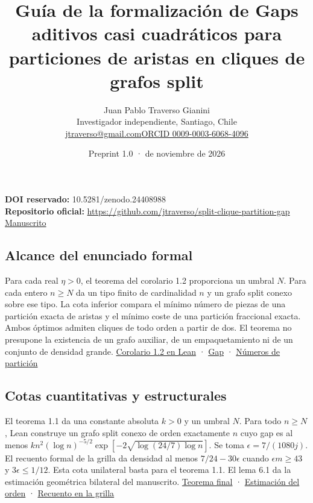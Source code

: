 \documentclass[spanish,11pt,a4paper]{article}
\title{Guía de la formalización de Gaps aditivos casi cuadráticos para particiones de aristas en cliques de grafos split}
\author{Juan Pablo Traverso Gianini\\\small Investigador independiente, Santiago, Chile\\\small\href{mailto:jtraverso@gmail.com}{jtraverso@gmail.com}\quad\href{https://orcid.org/0009-0003-6068-4096}{ORCID 0009-0003-6068-4096}}
\date{Preprint 1.0 \enspace · \enspace 21 de noviembre de 2026}
\begin{document}
\raggedbottom\maketitle
\noindent\textbf{DOI reservado:} 10.5281/zenodo.24408988\\
\textbf{Repositorio oficial:} \url{https://github.com/jtraverso/split-clique-partition-gap}\\
\href{https://github.com/jtraverso/split-clique-partition-gap/blob/main/preprints/SPLITGAP/01_manuscript/split-gap-es.pdf}{Manuscrito}
\subsection{Alcance del enunciado formal}\label{alcance-del-enunciado-formal}

Para cada real \(\eta>0\), el teorema del corolario 1.2 proporciona un umbral \(N\). Para cada entero \(n\ge N\) da un tipo finito de cardinalidad \(n\) y un grafo split conexo sobre ese tipo. La cota inferior compara el mínimo número de piezas de una partición exacta de aristas y el mínimo coste de una partición fraccional exacta. Ambos óptimos admiten cliques de todo orden a partir de dos. El teorema no presupone la existencia de un grafo auxiliar, de un empaquetamiento ni de un conjunto de densidad grande. \href{https://github.com/jtraverso/split-clique-partition-gap/blob/ccb5444b2ecdff9de1d6221133633a25a224953d/R434/UniversalR434.lean}{Corolario 1.2 en Lean} · \href{https://github.com/jtraverso/split-clique-partition-gap/blob/ccb5444b2ecdff9de1d6221133633a25a224953d/GapExtremal/Defs.lean}{Gap} · \href{https://github.com/jtraverso/split-clique-partition-gap/blob/ccb5444b2ecdff9de1d6221133633a25a224953d/GraphBase/Clique/Partition.lean}{Números de partición}

\subsection{Cotas cuantitativas y estructurales}\label{cotas-cuantitativas-y-estructurales}

El teorema 1.1 da una constante absoluta \(k>0\) y un umbral \(N\). Para todo \(n\ge N\), Lean construye un grafo split conexo de orden exactamente \(n\) cuyo gap es al menos \(k n^2(\log n)^{-5/2}\exp[-2\sqrt{\log(24/7)\log n}]\). Se toma \(\epsilon=7/(1080j)\). El recuento formal de la grilla da densidad al menos \(7/24-30\epsilon\) cuando \(\epsilon m\ge43\) y \(3\epsilon\le1/12\). Esta cota unilateral basta para el teorema 1.1. El lema 6.1 da la estimación geométrica bilateral del manuscrito. \href{https://github.com/jtraverso/split-clique-partition-gap/blob/ccb5444b2ecdff9de1d6221133633a25a224953d/R434/PolylogGap.lean}{Teorema final} · \href{https://github.com/jtraverso/split-clique-partition-gap/blob/ccb5444b2ecdff9de1d6221133633a25a224953d/R434/PolylogOrder.lean}{Estimación del orden} · \href{https://github.com/jtraverso/split-clique-partition-gap/blob/ccb5444b2ecdff9de1d6221133633a25a224953d/R434/DensityThreshold.lean}{Recuento en la grilla}
\end{document}
